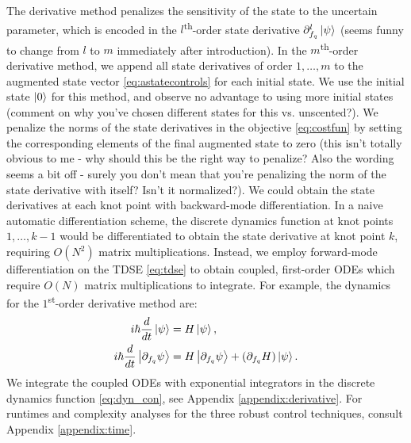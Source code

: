 The derivative method penalizes the sensitivity of the state
to the uncertain parameter, which is encoded in the $l$\textsuperscript{th}-order
state derivative $\partial_{f_{q}}^{l} \ket{\psi}$ (seems funny to change from $l$ to $m$ immediately after introduction). In the $m$\textsuperscript{th}-order
derivative method, we append all state derivatives of order $1, \dots, m$
to the augmented state vector \eqref{eq:astatecontrols}
for each initial state. We use the initial state $\ket{0}$ for this method,
and observe no advantage to using more initial states (comment on why you've chosen different states for this vs. unscented?).
We penalize the norms of the state derivatives
in the objective \eqref{eq:costfun} by setting the corresponding elements
of the final augmented state to zero (this isn't totally obvious to me - why should this be the right way to penalize? Also the wording seems a bit off - surely you don't mean that you're penalizing the norm of the state derivative with itself? Isn't it normalized?).
We could obtain the state derivatives at each knot point
with backward-mode differentiation.
In a naive automatic differentiation scheme,
the discrete dynamics function at knot points
$1, \dots, k - 1$ would be differentiated to obtain the state
derivative at knot point $k$, requiring
$O(N^{2})$ matrix multiplications. Instead, we 
employ forward-mode differentiation on the TDSE \eqref{eq:tdse}
to obtain coupled, first-order ODEs
which require $O(N)$ matrix multiplications to integrate.
For example, the dynamics for the $1$\textsuperscript{st}-order derivative method are:
\begin{align}
  i \hbar \frac{d}{dt} \ket{\psi} &= H \ket{\psi},\\
  i \hbar \frac{d}{dt} \ket{\partial_{f_{q}}\psi} &=
  H \ket{\partial_{f_{q}} \psi} +
  (\partial_{f_{q}} H) \ket{\psi}.
  \label{eq:d1dyn}
\end{align}
We integrate the coupled ODEs with exponential
integrators
in the discrete dynamics function \eqref{eq:dyn_con}, see Appendix \ref{appendix:derivative}. For runtimes
and complexity analyses for the three robust control techniques,
consult Appendix \ref{appendix:time}.

